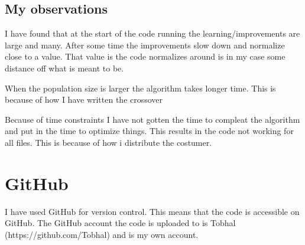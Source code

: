 \documentclass[10pt]{article}
\begin{document}
    \subsection{My observations}
    I have found that at the start of the code running the learning/improvements are large and many. After some time the improvements slow down and normalize close to a value. That value is the code normalizes around is in my case some distance off what is meant to be.

    When the population size is larger the algorithm takes longer time. This is because of how I have written the crossover

    Because of time constraints I have not gotten the time to compleat the algorithm and put in the time to optimize things. This results in the code not working for all files. This is because of how i distribute the costumer. 

    \section{GitHub}
    I have used GitHub for version control. This means that the code is accessible on GitHub. The GitHub account the code is uploaded to is Tobhal (https://github.com/Tobhal) and is my own account.
\end{document}
